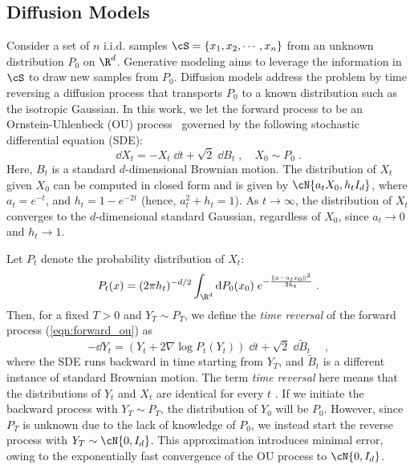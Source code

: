 \subsection{Diffusion Models}
Consider a set of $n$ i.i.d. samples $\cS=\{x_1,x_2,\cdots,x_n\}$ from an unknown distribution $P_0$ on $\R^d$. Generative modeling aims to leverage the information in $\cS$ to draw new samples from $P_0$. Diffusion models address the problem by time reversing a diffusion process that transports $P_0$ to a known distribution such as the isotropic Gaussian. 
In this work, we let the forward process to be an Ornstein-Uhlenbeck (OU) process~\cite{gardiner_stochastic_2009} governed by the following stochastic differential equation (SDE):
\begin{equation}\label{eqn:forward_ou}
    \dd X_t = - X_t \;  \dd t +\sqrt{2} \; \dd B_t\;,\quad X_0\sim P_0\;.
\end{equation}
Here, $B_t$ is a standard $d$-dimensional Brownian motion. The distribution of $X_t$ given $X_0$ can be computed in closed form and is given by $\cN{a_tX_0,h_tI_d}$, where $a_t=e^{-t}$, and $h_t=1-e^{-2t}$ (hence, $a_t^2+h_t=1$). As $t\to\infty$, the distribution of $X_t$ converges to the $d$-dimensional standard Gaussian, regardless of $X_0$, since $a_t\to 0$ and $h_t\to 1$. 

Let $P_t$ denote the probability distribution of $X_t$:
\begin{equation}\label{eqn:marginal_prob_forward}
    P_t(x) = {(2\pi h_t)^{-d/2}}\int_{\R^d}  \dd P_0(x_0) \; e^{-\frac{\norm{x-a_tx_0}^2}{2h_t}}\;.
\end{equation}
Then, for a fixed $T>0$ and $Y_T\sim P_T$, we define the \textit{time reversal} of the forward process (\ref{eqn:forward_ou}) as 
\begin{equation}\label{eqn:backward_sde}
    -\dd Y_t = \left(Y_t+2\nabla\log P_{t}(Y_t)\right) \;  \dd t+\sqrt{2} \; \dd \tilde{B}_t\quad \;,
\end{equation}
where the SDE runs backward in time starting from $Y_T$, and $\tilde{B}_t$ is a different instance of standard Brownian motion. 
The term \emph{time reversal} here means that the distributions of $Y_t$ and $X_t$ are identical for every $t$ \cite{anderson_reverse-time_1982, haussmann_time_1986}.
If we initiate the backward process with $Y_T\sim P_T$, the distribution of $Y_0$ will be $P_0$. However, since $P_T$ is unknown due to the lack of knowledge of $P_0$, we instead start the reverse process with $Y_T\sim\cN{0,I_d}$. This approximation introduces minimal error, owing to the exponentially fast convergence of the OU process to $\cN{0,I_d}$. 


